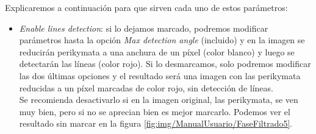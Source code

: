 Explicaremos a continuación para que sirven cada uno de estos parámetros:
\begin{itemize}
    \item \textit{Enable lines detection}: si lo dejamos marcado, podremos modificar parámetros hasta la opción \textit{Max detection angle} (incluido) y en la imagen se reducirán perikymata a una anchura de un píxel (color blanco) y luego se detectarán las líneas (color rojo). Si lo desmarcamos, solo podremos modificar las dos últimas opciones y el resultado será una imagen con las perikymata reducidas a un píxel marcadas de color rojo, sin detección de líneas.\\Se recomienda desactivarlo si en la imagen original, las perikymata, se ven muy bien, pero si no se aprecian bien es mejor marcarlo. Podemos ver el resultado sin marcar en la figura \ref{fig:img/ManualUsuario/FaseFiltrado5}. 


\end{itemize}
